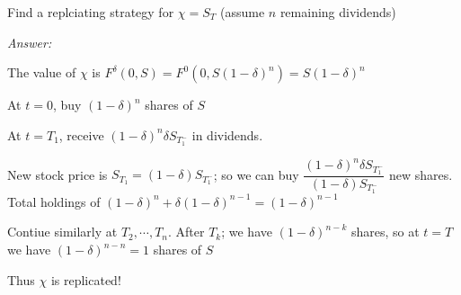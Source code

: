 \noindent Find a replciating strategy for $\chi = S_T$ (assume $n$ remaining dividends)\par
\noindent\textit{Answer:}\par
\noindent The value of $\chi$ is $F^{\delta}(0,S) = F^0(0,S(1-\delta)^n) = S(1-\delta)^n$\par
\noindent At $t=0$, buy $(1-\delta)^n$ shares of $S$\par
\noindent At $t=T_1$, receive $(1-\delta)^n\delta S_{T_1^-}$ in dividends.\par
\noindent New stock price is $S_{T_1} = (1-\delta)S_{T_1^-}$; so we can buy $\dfrac{(1-\delta)^n\delta S_{T_1^-}}{(1-\delta)S_{T_1^-}}$ new shares. Total holdings of $(1-\delta)^n+\delta(1-\delta)^{n-1} = (1-\delta)^{n-1}$\par
\noindent Contiue similarly at $T_2,\cdots,T_n$. After $T_k$; we have $(1-\delta)^{n-k}$ shares, so at $t=T$ we have $(1-\delta)^{n-n}=1$ shares of $S$\par
\noindent Thus $\chi$ is replicated!
\par\bigskip
